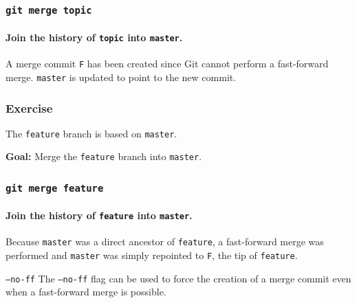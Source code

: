 \documentclass{beamer}
\newcommand\gitcmd[1]{\texttt{git #1}}
\newcommand\gflag[1]{\texttt{#1}}
\newcommand\grefspec[1]{\texttt{#1}}
\newcommand\gbranch[1]{\texttt{#1}}
\newcommand\goal[1]{\textbf{Goal:} #1}
\begin{document}
\begin{frame}
  \frametitle{\gitcmd{merge topic}}
  \framesubtitle{Join the history of \gbranch{topic} into \gbranch{master}.}
  
  \begin{figure}
    \centering
  \end{figure}

  A merge commit \grefspec{F} has been created since Git cannot perform a fast-forward merge. \gbranch{master} is updated to point to the new commit.
\end{frame}

\begin{frame}
  \frametitle{Exercise}

  The \gbranch{feature} branch is based on \gbranch{master}.

  \goal{Merge the \gbranch{feature} branch into \gbranch{master}.}
  
  \begin{figure}
    \centering
  \end{figure}
\end{frame}

\begin{frame}
  \frametitle{\gitcmd{merge feature}}
  \framesubtitle{Join the history of \gbranch{feature} into \gbranch{master}.}
  
  \begin{figure}
    \centering
  \end{figure}

  Because \gbranch{master} was a direct ancestor of \gbranch{feature}, a fast-forward merge was performed and \gbranch{master} was simply repointed to \grefspec{F}, the tip of \gbranch{feature}.
  \vfill
  \begin{block}{\gflag{--no-ff}}
    The \gflag{--no-ff} flag can be used to force the creation of a merge commit even when a fast-forward merge is possible.
  \end{block}
\end{frame}
\end{document}
